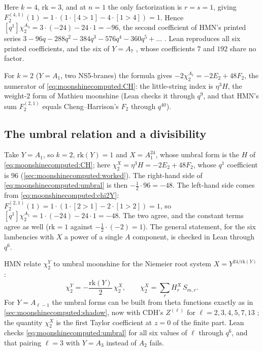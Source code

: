 \begin{example}[$Y=A_3$]
Here $k=4$, $\mathrm{rk}=3$, and at $n=1$ the only factorization is $r=s=1$, giving
$F_2^{(4,1)}(1)=1\cdot(1\cdot[4>1]-4\cdot[1>4])=1$. Hence
$[q^1]\chi_2^{A_3}=3\cdot(-24)-24\cdot1=-96$, the second coefficient of HMN's printed
series $3-96q-288q^2-384q^3-576q^4-360q^5+\dots$ . Lean
reproduces all six printed coefficients, and the six of $Y=A_7$ , whose coefficients $7$ and $192$ share no factor.
\end{example}

For $k=2$ ($Y=A_1$, two NS5-branes) the formula gives $-2\chi_2^{A_1}=-2E_2+48F_2$, the
numerator of \eqref{eq:moonshinecomputed:CH}: the little-string index is
$\eta^3H$, the weight-$2$ form of Mathieu moonshine (Lean checks it through $q^9$, and that
HMN's sum $F_2^{(2,1)}$ equals Cheng--Harrison's $F_2$ through $q^{40}$).

\subsection{The umbral relation and a divisibility}

\begin{example}[The relation \eqref{eq:moonshinecomputed:umbral} at $\ell=2$, by hand]
Take $Y=A_1$, so $k=2$, $\mathrm{rk}(Y)=1$ and $X=A_1^{24}$, whose umbral form is the $H$ of
\eqref{eq:moonshinecomputed:CH}; here $\chi_2^X=\eta^3H=-2E_2+48F_2$, whose $q^1$
coefficient is $96$ (\cref{sec:moonshinecomputed:worked}). The right-hand side of
\eqref{eq:moonshinecomputed:umbral} is then $-\tfrac12\cdot96=-48$. The left-hand side comes
from \eqref{eq:moonshinecomputed:chi2Y}: $F_2^{(2,1)}(1)=1\cdot(1\cdot[2>1]-2\cdot[1>2])=1$,
so $[q^1]\chi_2^{A_1}=1\cdot(-24)-24\cdot1=-48$. The two agree, and the constant terms agree
as well ($\mathrm{rk}=1$ against $-\tfrac12\cdot(-2)=1$). The general statement, for the six
lambencies with $X$ a power of a single $A$ component, is checked in Lean through $q^6$.
\end{example}

HMN relate $\chi_2^Y$ to umbral moonshine for the Niemeier root system
$X=Y^{24/\mathrm{rk}(Y)}$ :
\begin{equation}\label{eq:moonshinecomputed:umbral}
  \chi_2^Y=-\frac{\mathrm{rk}(Y)}2\,\chi_2^X,\qquad \chi_2^X=\sum_rH^X_r\,S_{m,r}.
\end{equation}
For $Y=A_{\ell-1}$ the umbral forms can be built from theta functions exactly as in
\cref{sec:moonshinecomputed:shadow}, now with CDH's $Z^{(\ell)}$ for
$\ell=2,3,4,5,7,13$ ; the
quantity $\chi_2^X$ is the first Taylor coefficient at $z=0$ of the finite part. Lean checks
\eqref{eq:moonshinecomputed:umbral} for all six values of $\ell$ through $q^6$, and that
pairing $\ell=3$ with $Y=A_3$ instead of $A_2$ fails.

